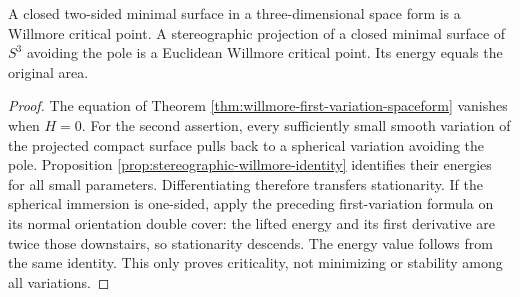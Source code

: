 \begin{corollary}\label{cor:minimal-spherical-willmore}
A closed two-sided minimal surface in a three-dimensional space form is a Willmore critical point. A stereographic projection of a closed minimal surface of $S^3$ avoiding the pole is a Euclidean Willmore critical point. Its energy equals the original area.
\end{corollary}
\begin{proof}
The equation of Theorem \ref{thm:willmore-first-variation-spaceform} vanishes when $H=0$. For the second assertion, every sufficiently small smooth variation of the projected compact surface pulls back to a spherical variation avoiding the pole. Proposition \ref{prop:stereographic-willmore-identity} identifies their energies for all small parameters. Differentiating therefore transfers stationarity. If the spherical immersion is one-sided, apply the preceding first-variation formula on its normal orientation double cover: the lifted energy and its first derivative are twice those downstairs, so stationarity descends. The energy value follows from the same identity. This only proves criticality, not minimizing or stability among all variations.
\end{proof}

